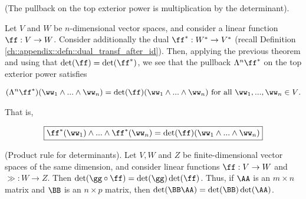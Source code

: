 \begin{theorem}
\label{ch::exterior_pwrs::rmk::top_pullback_det}

    (The pullback on the top exterior power is multiplication by the determinant).
    
    Let $V$ and $W$ be $n$-dimensional vector spaces, and consider a linear function $\ff:V \rightarrow W$. Consider additionally the dual $\ff^*:W^* \rightarrow V^*$ (recall Definition \ref{ch::appendix::defn::dual_transf_after_id}). Then, applying the previous theorem and using that $\det(\ff) = \det(\ff^*)$, we see that the pullback $\Lambda^n \ff^*$ on the top exterior power satisfies
    
    \begin{align*}
        (\Lambda^n \ff^*)(\ww_1 \wedge ... \wedge \ww_n) = \det(\ff) ( \ww_1 \wedge ... \wedge \ww_n ) \text{ for all $\ww_1, ..., \ww_n \in V$}.
    \end{align*}
    
    That is,
    
    \begin{align*}
        \boxed
        {
            \ff^*(\ww_1) \wedge ... \wedge \ff^*(\ww_n) = \det(\ff)(\ww_1 \wedge ... \wedge \ww_n)
        }
    \end{align*}
\end{theorem}

\begin{theorem}
    (Product rule for determinants). Let $V, W$ and $Z$ be finite-dimensional vector spaces of the same dimension, and consider linear functions $\ff:V \rightarrow W$ and $\gg:W \rightarrow Z$. Then $\det(\gg \circ \ff) = \det(\gg) \det(\ff)$. Thus, if $\AA$ is an $m \times n$ matrix and $\BB$ is an $n \times p$ matrix, then $\det(\BB \AA) = \det(\BB) \det(\AA)$.
\end{theorem}

